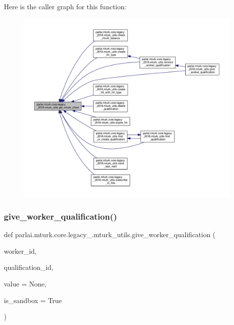 Here is the caller graph for this function\+:
\nopagebreak
\begin{figure}[H]
\begin{center}
\leavevmode
\includegraphics[width=350pt]{namespaceparlai_1_1mturk_1_1core_1_1legacy__2018_1_1mturk__utils_a9999d5b551e569fe3ddd368e4e659b65_icgraph}
\end{center}
\end{figure}
\mbox{\label{namespaceparlai_1_1mturk_1_1core_1_1legacy__2018_1_1mturk__utils_aaaf07be966ed2720b918f8dd2775e18a}} 
\subsubsection{\texorpdfstring{give\+\_\+worker\+\_\+qualification()}{give\_worker\_qualification()}}
{\footnotesize\ttfamily def parlai.\+mturk.\+core.\+legacy\+\_.\+mturk\+\_\+utils.\+give\+\_\+worker\+\_\+qualification (\begin{DoxyParamCaption}\item[{}]{worker\+\_\+id,  }\item[{}]{qualification\+\_\+id,  }\item[{}]{value = {\ttfamily None},  }\item[{}]{is\+\_\+sandbox = {\ttfamily True} }\end{DoxyParamCaption})}


